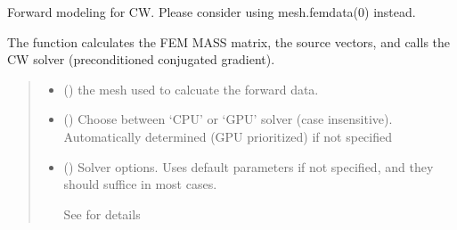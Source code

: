 \documentclass[letterpaper,10pt,english]{sphinxmanual}
\begin{document}
\begin{fulllineitems}
\label{\detokenize{_autosummary/nirfasterff.forward.femdata.femdata_stnd_CW:nirfasterff.forward.femdata.femdata_stnd_CW}}
\pysigstartsignatures
\pysiglinewithargsret
{}
{\sphinxparamcomma {}\sphinxparamcomma {}}
{}
\pysigstopsignatures
\sphinxAtStartPar
Forward modeling for CW. Please consider using mesh.femdata(0) instead.

\sphinxAtStartPar
The function calculates the FEM MASS matrix, the source vectors, and calls the CW solver (preconditioned conjugated gradient).
\begin{quote}\begin{description}
\begin{itemize}
\item {} 
\sphinxAtStartPar
{} () \textendash{} the mesh used to calcuate the forward data.

\item {} 
\sphinxAtStartPar
{} (\sphinxstyleliteralemphasis{\sphinxupquote{, }}) \textendash{} Choose between ‘CPU’ or ‘GPU’ solver (case insensitive). Automatically determined (GPU prioritized) if not specified

\item {} 
\sphinxAtStartPar
{} ({\hyperref[\detokenize{_autosummary/nirfasterff.utils.SolverOptions:nirfasterff.utils.SolverOptions}]{}}\sphinxstyleliteralemphasis{\sphinxupquote{, }}) \textendash{} 
\sphinxAtStartPar
Solver options. Uses default parameters if not specified, and they should suffice in most cases.

\sphinxAtStartPar
See {\hyperref[\detokenize{_autosummary/nirfasterff.utils.SolverOptions:nirfasterff.utils.SolverOptions}]{}} for details



\end{itemize}
\end{description}
\end{quote}
\end{fulllineitems}
\end{document}

